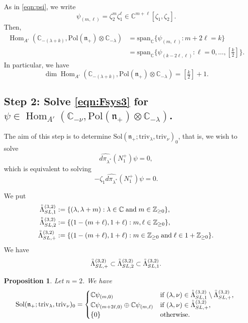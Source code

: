\documentclass[reqno,11pt]{amsart}
\newtheorem{prop}[equation]{Proposition}
\theoremstyle{remark}
\theoremstyle{definition}
\numberwithin{equation}{section}
\newcommand{\gL}{\Lambda}
\newcommand{\fn}{{\mathfrak n}}
\newcommand{\C}{\mathbb{C}}
\newcommand{\Z}{\mathbb{Z}}
\newcommand{\Hom}{\operatorname{Hom}}
\newcommand{\spn}{\text{span}}
\newcommand{\Sol}{\mathrm{Sol}}
\newcommand{\Pol}{\mathrm{Pol}}
\newcommand{\triv}{\mathrm{triv}}
\newcommand{\dpi}{d\pi}
\begin{document}
As in \eqref{eqn:psi}, 
we write
\begin{equation*}
\psi_{(m, \ell)} = \zeta_2^m\zeta_1^\ell
\in \C^{m+\ell}[\zeta_1,\zeta_2].
\end{equation*}
Then,
\begin{align}\label{eqn:MA4}
\Hom_{A'}(\C_{-(\lambda+k)}, \Pol(\fn_+)\otimes \C_{-\lambda})
&=\spn_{\C}
\{
\psi_{(m,\ell)}: m+2\ell = k
\}\\
&=\spn_{\C}
\{
\psi_{(k-2\ell,\ell)}: \ell  = 0,\ldots, [\tfrac{k}{2}]
\}.
\end{align}
In particular, we have 
\begin{equation*}
\dim \Hom_{A'}(\C_{-(\lambda+k)}, \Pol(\fn_+)\otimes \C_{-\lambda})
=[\tfrac{k}{2}]+1.
\end{equation*}




\subsection{Step 2: 
Solve \eqref{eqn:Fsys3}
for $\psi \in \Hom_{A'}(\C_{-\nu}, \Pol(\fn_+)\otimes \C_{-\lambda})$.
}

The aim of this step is to determine $\Sol(\fn_+; \triv_{\lambda}, \triv_{\nu})_0$,
that is,
we wish to solve
\begin{equation*}
\widehat{\dpi_{\lambda^*}}(N_1^+)\psi =0,
\end{equation*}
which is equivalent to solving
\begin{equation*}
-\zeta_1\widehat{\dpi_{\lambda^*}}(N_1^+)\psi =0.
\end{equation*}

We put
\begin{align*}
\accentset{\circ}{\gL}^{(3,2)}_{SL,1}&:=\{
(\lambda, \lambda+m)
:  \lambda \in \C \; \text{and} \; m\in \Z_{\geq 0}\},\\
\accentset{\circ}{\gL}^{(3,2)}_{SL,2}&:=\{
(1-(m+\ell), 1+\ell) :  m,  \ell\in \Z_{\geq 0}\},\\
\accentset{\circ}{\gL}^{(3,2)}_{SL,+}&:=\{
(1-(m+\ell), 1+\ell) :  m\in \Z_{\geq 0} \; \text{and} \; \ell\in 1+\Z_{\geq 0}\}.
\end{align*}
We have 
\begin{equation*}
\accentset{\circ}{\gL}^{(3,2)}_{SL,+} \subset 
\accentset{\circ}{\gL}^{(3,2)}_{SL,2} \subset
\accentset{\circ}{\gL}^{(3,2)}_{SL,1}.
\end{equation*}

\begin{prop}\label{prop:MA3}
Let $n=2$. We have
\begin{equation*}
\Sol(\fn_+; \triv_{\lambda}, \triv_{\nu})_0
=
\begin{cases}
\C \psi_{(m,0)} &\text{if $(\lambda,\nu) \in 
\accentset{\circ}{\gL}^{(3,2)}_{SL,1}
\setminus \accentset{\circ}{\gL}^{(3,2)}_{SL,+}$, }\\
\C\psi_{(m+2\ell, 0)} \oplus \C\psi_{(m,\ell)}
&\text{if $(\lambda,\nu) \in \accentset{\circ}{\gL}^{(3,2)}_{SL,+}$,}\\
\{0\} &\text{otherwise}.
\end{cases}
\end{equation*}
\end{prop}
\end{document}
